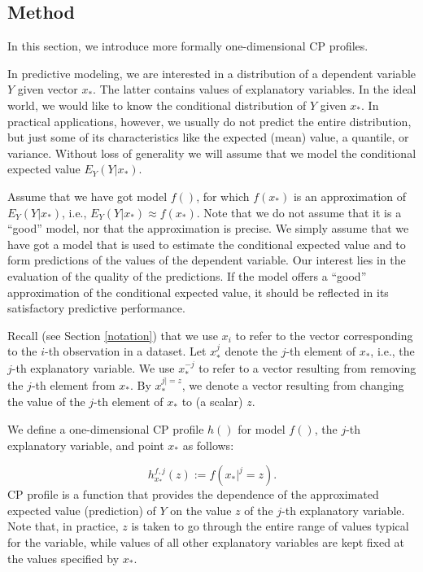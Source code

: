 \documentclass[12pt,]{krantz}
\begin{document}
\hypertarget{CPMethod}{%
\subsection{Method}\label{CPMethod}}

In this section, we introduce more formally one-dimensional CP profiles.

In predictive modeling, we are interested in a distribution of a dependent variable \(Y\) given vector \(x_*\). The latter contains values of explanatory variables. In the ideal world, we would like to know the conditional distribution of \(Y\) given \(x_*\). In practical applications, however, we usually do not predict the entire distribution, but just some of its characteristics like the expected (mean) value, a quantile, or variance. Without loss of generality we will assume that we model the conditional expected value \(E_Y(Y | x_*)\).

Assume that we have got model \(f()\), for which \(f(x_*)\) is an approximation of \(E_Y(Y | x_*)\), i.e., \(E_Y(Y | x_*) \approx f(x_*)\). Note that we do not assume that it is a ``good'' model, nor that the approximation is precise. We simply assume that we have got a model that is used to estimate the conditional expected value and to form predictions of the values of the dependent variable. Our interest lies in the evaluation of the quality of the predictions. If the model offers a ``good'' approximation of the conditional expected value, it should be reflected in its satisfactory predictive performance.

Recall (see Section \ref{notation}) that we use \(x_i\) to refer to the vector corresponding to the \(i\)-th observation in a dataset. Let \(x^{j}_{*}\) denote the \(j\)-th element of \(x_{*}\), i.e., the \(j\)-th explanatory variable. We use \(x^{-j}_{*}\) to refer to a vector resulting from removing the \(j\)-th element from \(x_{*}\). By \(x^{j|=z}_{*}\), we denote a vector resulting from changing the value of the \(j\)-th element of \(x_{*}\) to (a scalar) \(z\).

We define a one-dimensional CP profile \(h()\) for model \(f()\), the \(j\)-th explanatory variable, and point \(x_*\) as follows:

\[
h^{f,j}_{x_*}(z) := f(x_*|^j=z).
\]
CP profile is a function that provides the dependence of the approximated expected value (prediction) of \(Y\) on the value \(z\) of the \(j\)-th explanatory variable. Note that, in practice, \(z\) is taken to go through the entire range of values typical for the variable, while values of all other explanatory variables are kept fixed at the values specified by \(x_*\).
\end{document}
